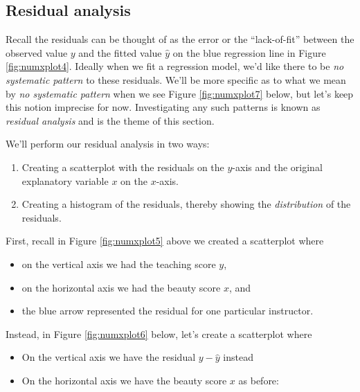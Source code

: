 \documentclass[12pt,]{krantz}
\providecommand{\tightlist}{%
  \setlength{\itemsep}{0pt}\setlength{\parskip}{0pt}}
\begin{document}
\subsection{Residual analysis}\label{model1residuals}

Recall the residuals can be thought of as the error or the
``lack-of-fit'' between the observed value \(y\) and the fitted value
\(\widehat{y}\) on the blue regression line in Figure
\ref{fig:numxplot4}. Ideally when we fit a regression model, we'd like
there to be \emph{no systematic pattern} to these residuals. We'll be
more specific as to what we mean by \emph{no systematic pattern} when we
see Figure \ref{fig:numxplot7} below, but let's keep this notion
imprecise for now. Investigating any such patterns is known as
\emph{residual analysis} and is the theme of this section.

We'll perform our residual analysis in two ways:

\begin{enumerate}
\def\labelenumi{\arabic{enumi}.}
\tightlist
\item
  Creating a scatterplot with the residuals on the \(y\)-axis and the
  original explanatory variable \(x\) on the \(x\)-axis.
\item
  Creating a histogram of the residuals, thereby showing the
  \emph{distribution} of the residuals.
\end{enumerate}

First, recall in Figure \ref{fig:numxplot5} above we created a
scatterplot where

\begin{itemize}
\tightlist
\item
  on the vertical axis we had the teaching score \(y\),
\item
  on the horizontal axis we had the beauty score \(x\), and
\item
  the blue arrow represented the residual for one particular instructor.
\end{itemize}

Instead, in Figure \ref{fig:numxplot6} below, let's create a scatterplot
where

\begin{itemize}
\tightlist
\item
  On the vertical axis we have the residual \(y-\widehat{y}\) instead
\item
  On the horizontal axis we have the beauty score \(x\) as before:
\end{itemize}
\end{document}
